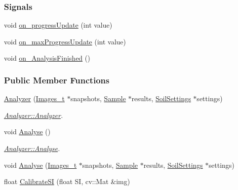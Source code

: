 \subsubsection*{Signals}
\begin{DoxyCompactItemize}
\item 
void \hyperlink{class_soil_analyzer_1_1_analyzer_a808a8c21029471c4af0be996cb67d14c}{on\+\_\+progress\+Update} (int value)
\item 
void \hyperlink{class_soil_analyzer_1_1_analyzer_ac22302563bb30934efe2365831d5a1a6}{on\+\_\+max\+Progress\+Update} (int value)
\item 
void \hyperlink{class_soil_analyzer_1_1_analyzer_a49245eaf7ee46c065e0a1a71135b6904}{on\+\_\+\+Analysis\+Finished} ()
\end{DoxyCompactItemize}
\subsubsection*{Public Member Functions}
\begin{DoxyCompactItemize}
\item 
\hyperlink{class_soil_analyzer_1_1_analyzer_a4e67707b0c63f6898f753dd1f2e08e6a}{Analyzer} (\hyperlink{class_soil_analyzer_1_1_analyzer_a55e2c84ab42cb967d718dd18295c1f91}{Images\+\_\+t} $\ast$snapshots, \hyperlink{class_soil_analyzer_1_1_sample}{Sample} $\ast$results, \hyperlink{class_soil_analyzer_1_1_soil_settings}{Soil\+Settings} $\ast$settings)
\begin{DoxyCompactList}\small\item\em \hyperlink{class_soil_analyzer_1_1_analyzer_a4e67707b0c63f6898f753dd1f2e08e6a}{Analyzer\+::\+Analyzer}. \end{DoxyCompactList}\item 
void \hyperlink{class_soil_analyzer_1_1_analyzer_a1cb605c255d35e85ccaae06a76917188}{Analyse} ()
\begin{DoxyCompactList}\small\item\em \hyperlink{class_soil_analyzer_1_1_analyzer_a1cb605c255d35e85ccaae06a76917188}{Analyzer\+::\+Analyse}. \end{DoxyCompactList}\item 
void \hyperlink{class_soil_analyzer_1_1_analyzer_afcbb3b1a583d1fe9a7b9e424a7ded3df}{Analyse} (\hyperlink{class_soil_analyzer_1_1_analyzer_a55e2c84ab42cb967d718dd18295c1f91}{Images\+\_\+t} $\ast$snapshots, \hyperlink{class_soil_analyzer_1_1_sample}{Sample} $\ast$results, \hyperlink{class_soil_analyzer_1_1_soil_settings}{Soil\+Settings} $\ast$settings)
\item 
float \hyperlink{class_soil_analyzer_1_1_analyzer_a79914fb56b7d9b71ae2fa049329f9413}{Calibrate\+S\+I} (float S\+I, cv\+::\+Mat \&img)
\end{DoxyCompactItemize}
